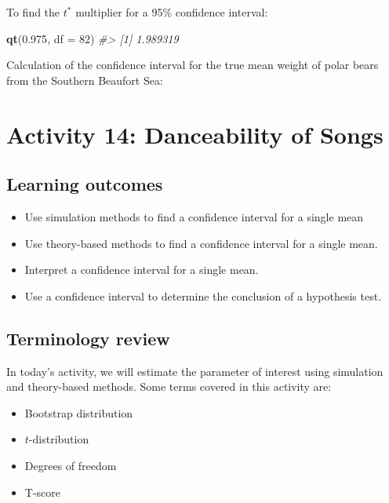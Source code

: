 \documentclass[
]{report}
\newenvironment{Shaded}{\begin{snugshade}}{\end{snugshade}}
\newcommand{\AttributeTok}[1]{\textcolor[rgb]{0.13,0.29,0.53}{#1}}
\newcommand{\CommentTok}[1]{\textcolor[rgb]{0.56,0.35,0.01}{\textit{#1}}}
\newcommand{\DecValTok}[1]{\textcolor[rgb]{0.00,0.00,0.81}{#1}}
\newcommand{\FloatTok}[1]{\textcolor[rgb]{0.00,0.00,0.81}{#1}}
\newcommand{\FunctionTok}[1]{\textcolor[rgb]{0.13,0.29,0.53}{\textbf{#1}}}
\newcommand{\NormalTok}[1]{#1}
\begin{document}
\newpage

To find the \(t^*\) multiplier for a 95\% confidence interval:

\begin{Shaded}
\begin{Highlighting}[]
\FunctionTok{qt}\NormalTok{(}\FloatTok{0.975}\NormalTok{, }\AttributeTok{df =} \DecValTok{82}\NormalTok{)}
\CommentTok{\#\textgreater{} [1] 1.989319}
\end{Highlighting}
\end{Shaded}

Calculation of the confidence interval for the true mean weight of polar bears from the Southern Beaufort Sea:

\vspace{0.8in}

\newpage

\section{Activity 14: Danceability of Songs}\label{activity-14-danceability-of-songs}


\subsection{Learning outcomes}\label{learning-outcomes-3}

\begin{itemize}
\item
  Use simulation methods to find a confidence interval for a single mean
\item
  Use theory-based methods to find a confidence interval for a single mean.
\item
  Interpret a confidence interval for a single mean.
\item
  Use a confidence interval to determine the conclusion of a hypothesis test.
\end{itemize}

\subsection{Terminology review}\label{terminology-review-3}

In today's activity, we will estimate the parameter of interest using simulation and theory-based methods. Some terms covered in this activity are:

\begin{itemize}
\item
  Bootstrap distribution
\item
  \(t\)-distribution
\item
  Degrees of freedom
\item
  T-score
\end{itemize}
\end{document}
